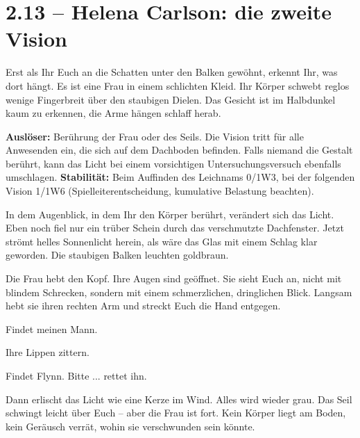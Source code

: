 \section{2.13 -- Helena Carlson: die zweite Vision}
\begin{vorlesetextalle}
Erst als Ihr Euch an die Schatten unter den Balken gewöhnt, erkennt Ihr, was dort hängt. Es ist eine Frau in einem schlichten Kleid. Ihr Körper schwebt reglos wenige Fingerbreit über den staubigen Dielen. Das Gesicht ist im Halbdunkel kaum zu erkennen, die Arme hängen schlaff herab.
\end{vorlesetextalle}
\begin{meisterinfo}
\textbf{Auslöser:} Berührung der Frau oder des Seils. Die Vision tritt für alle Anwesenden ein, die sich auf dem Dachboden befinden. Falls niemand die Gestalt berührt, kann das Licht bei einem vorsichtigen Untersuchungsversuch ebenfalls umschlagen. \textbf{Stabilität:} Beim Auffinden des Leichnams 0/1W3, bei der folgenden Vision 1/1W6 (Spielleiterentscheidung, kumulative Belastung beachten).
\end{meisterinfo}
\begin{vorlesetextalle}
In dem Augenblick, in dem Ihr den Körper berührt, verändert sich das Licht. Eben noch fiel nur ein trüber Schein durch das verschmutzte Dachfenster. Jetzt strömt helles Sonnenlicht herein, als wäre das Glas mit einem Schlag klar geworden. Die staubigen Balken leuchten goldbraun.

Die Frau hebt den Kopf. Ihre Augen sind geöffnet. Sie sieht Euch an, nicht mit blindem Schrecken, sondern mit einem schmerzlichen, dringlichen Blick. Langsam hebt sie ihren rechten Arm und streckt Euch die Hand entgegen.

\glqq{}Findet meinen Mann.\grqq{}

Ihre Lippen zittern.

\glqq{}Findet Flynn. Bitte ... rettet ihn.\grqq{}

Dann erlischt das Licht wie eine Kerze im Wind. Alles wird wieder grau. Das Seil schwingt leicht über Euch -- aber die Frau ist fort. Kein Körper liegt am Boden, kein Geräusch verrät, wohin sie verschwunden sein könnte.
\end{vorlesetextalle}

